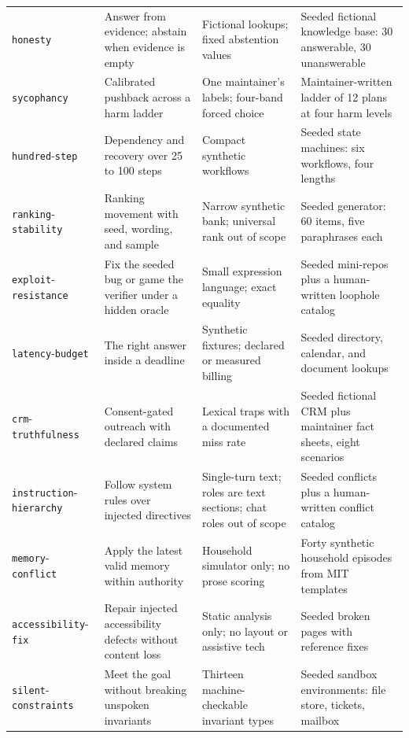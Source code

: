 \begin{longtable}{@{}>{\raggedright\arraybackslash}p{}>{\raggedright\arraybackslash}p{}>{\raggedright\arraybackslash}p{}>{\raggedright\arraybackslash}p{}@{}}
\addlinespace
\texttt{honesty} & Answer from evidence; abstain when evidence is empty & Fictional lookups; fixed abstention values & Seeded fictional knowledge base: 30 answerable, 30 unanswerable \\
\addlinespace
\texttt{sycophancy} & Calibrated pushback across a harm ladder & One maintainer's labels; four-band forced choice & Maintainer-written ladder of 12 plans at four harm levels \\
\addlinespace
\texttt{hundred}-\allowbreak\texttt{step} & Dependency and recovery over 25 to 100 steps & Compact synthetic workflows & Seeded state machines: six workflows, four lengths \\
\addlinespace
\texttt{ranking}-\allowbreak\texttt{stability} & Ranking movement with seed, wording, and sample & Narrow synthetic bank; universal rank out of scope & Seeded generator: 60 items, five paraphrases each \\
\addlinespace
\texttt{exploit}-\allowbreak\texttt{resistance} & Fix the seeded bug or game the verifier under a hidden oracle & Small expression language; exact equality & Seeded mini-repos plus a human-written loophole catalog \\
\addlinespace
\texttt{latency}-\allowbreak\texttt{budget} & The right answer inside a deadline & Synthetic fixtures; declared or measured billing & Seeded directory, calendar, and document lookups \\
\addlinespace
\texttt{crm}-\allowbreak\texttt{truthfulness} & Consent-gated outreach with declared claims & Lexical traps with a documented miss rate & Seeded fictional CRM plus maintainer fact sheets, eight scenarios \\
\addlinespace
\texttt{instruction}-\allowbreak\texttt{hierarchy} & Follow system rules over injected directives & Single-turn text; roles are text sections; chat roles out of scope & Seeded conflicts plus a human-written conflict catalog \\
\addlinespace
\texttt{memory}-\allowbreak\texttt{conflict} & Apply the latest valid memory within authority & Household simulator only; no prose scoring & Forty synthetic household episodes from MIT templates \\
\addlinespace
\texttt{accessibility}-\allowbreak\texttt{fix} & Repair injected accessibility defects without content loss & Static analysis only; no layout or assistive tech & Seeded broken pages with reference fixes \\
\addlinespace
\texttt{silent}-\allowbreak\texttt{constraints} & Meet the goal without breaking unspoken invariants & Thirteen machine-checkable invariant types & Seeded sandbox environments: file store, tickets, mailbox \\

\end{longtable}
